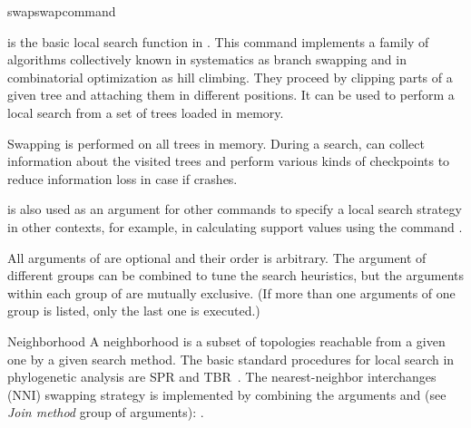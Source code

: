 \begin{command}{swap}{swapcommand}


	\begin{poydescription} 
             is the basic local search function in \poy. This
            command implements a family of algorithms collectively known in systematics as
            branch swapping and in combinatorial optimization as hill climbing. They proceed by clipping parts of a given tree and
            attaching them in different positions.  It can be
            used to perform a local search from a set of trees loaded in memory.

            Swapping is performed on all trees in memory. During a search,
             can collect information about the
            visited trees and perform various kinds of checkpoints to reduce
            information loss in case if \poy crashes.

             is also used as an argument for other
            commands to specify a local search strategy in other contexts, for example,
            in calculating support values using the command
            .
            
            All arguments of  are optional and their order
            is arbitrary. The argument of different groups can be combined to tune the search heuristics, but the arguments within each group of are mutually exclusive. (If more than one arguments of one group is listed, only the last one is executed.)
            
        \end{poydescription}

	\begin{arguments}

	\begin{argumentgroup}{Neighborhood}
	{A neighborhood is a subset of topologies reachable from a given one by a given search method. The basic standard procedures for local search in phylogenetic analysis are SPR and TBR~\cite{swofford1990}. The nearest-neighbor interchanges (NNI) swapping strategy is implemented by combining 
            the arguments  and  (see \emph{Join method} group of
            arguments): .
            }
            \label{swap_neigh}


\end{argumentgroup}
\end{arguments}
\end{command}
